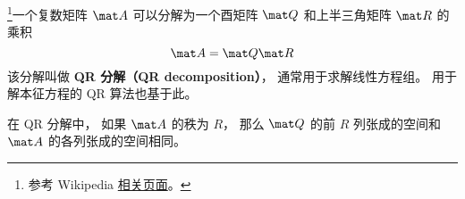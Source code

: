 

\footnote{参考 Wikipedia \href{https://en.wikipedia.org/wiki/QR_decomposition}{相关页面}。}一个复数矩阵 $\mat A$ 可以分解为一个酉矩阵 $\mat Q$ 和上半三角矩阵 $\mat R$ 的乘积
\begin{equation}
\mat A = \mat Q\mat R
\end{equation}
该分解叫做 \textbf{QR 分解（QR decomposition）}， 通常用于求解线性方程组。 用于解本征方程的 QR 算法也基于此。

在 QR 分解中， 如果 $\mat A$ 的秩为 $R$， 那么 $\mat Q$ 的前 $R$ 列张成的空间和 $\mat A$ 的各列张成的空间相同。
